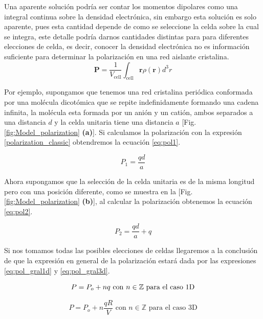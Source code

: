 

Una aparente solución podría ser contar los momentos dipolares como una integral continua sobre la densidad electrónica, sin embargo esta solución es solo aparente, pues esta cantidad depende de como se seleccione la celda sobre la cual se integra, este detalle podría darnos cantidades distintas para para diferentes elecciones de celda, es decir, conocer la densidad electrónica no es información suficiente para determinar la polarización en una red aislante cristalina.
\begin{equation}
\label{polarization_classic}
\textbf{P} = \frac{1}{V_\text{cell}}\int_\text{cell} \textbf{r} \rho(\textbf{r})d^3r
\end{equation}


Por ejemplo, supongamos que tenemos una red cristalina periódica conformada por una molécula dicotómica que se repite indefinidamente formando una cadena infinita, la molécula esta formada por un anión y un catión, ambos separados a una distancia $d$ y la celda unitaria tiene una distancia $a$ [Fig. \ref{fig:Model_polarization} \textbf{(a)}]. Si calculamos la polarización con la expresión \eqref{polarization_classic} obtendremos la ecuación \eqref{eq:pol1}.

\begin{equation}
    \label{eq:pol1}
    P_1 = \frac{qd}{a}
\end{equation}

Ahora supongamos que la selección de la celda unitaria es de la misma longitud pero con una posición diferente, como se muestra en la [Fig. \ref{fig:Model_polarization} \textbf{(b)}], al calcular la polarización obtenemos la ecuación \eqref{eq:pol2}.

\begin{equation}
    \label{eq:pol2}
    P_2 = \frac{qd}{a} + q
\end{equation}

Si nos tomamos todas las posibles elecciones de celdas llegaremos a la conclusión de que la expresión en general de la polarización estará dada por las expresiones \eqref{eq:pol_gral1d} y \eqref{eq:pol_gral3d}.

\begin{equation}
    \label{eq:pol_gral1d}
    P = P_o + nq\,\,  {\rm con} \,\,n \in \mathbb{Z}\,\, \text{para el caso 1D} 
\end{equation}

\begin{equation}
    \label{eq:pol_gral3d}
    P = P_o + n\frac{qR}{V}\,\,  \text{con} \,\,n \in \mathbb{Z}\,\, \text{para el caso 3D}
\end{equation}

